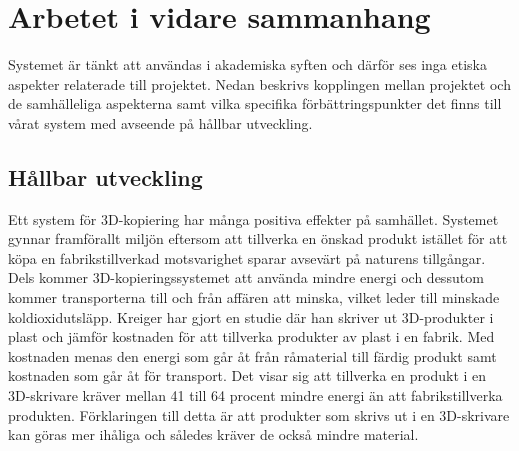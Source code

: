 
\section{Arbetet i vidare sammanhang}
\label{sec:work-wider-context}

Systemet är tänkt att användas i akademiska syften och därför ses inga etiska aspekter relaterade till projektet. Nedan beskrivs kopplingen mellan projektet och de samhälleliga aspekterna samt vilka specifika förbättringspunkter det finns till vårat system med avseende på hållbar utveckling.

\subsection{Hållbar utveckling}
\label{disc:hållbar_utveckling}
Ett system för 3D-kopiering har många positiva effekter på samhället. Systemet gynnar framförallt miljön eftersom att tillverka en önskad produkt istället för att köpa en fabrikstillverkad motsvarighet sparar avsevärt på naturens tillgångar. Dels kommer 3D-kopieringssystemet att använda mindre energi och dessutom kommer transporterna till och från affären att minska, vilket leder till minskade koldioxidutsläpp. Kreiger \cite{kreiger2013environmental} har gjort en studie där han skriver ut 3D-produkter i plast och jämför kostnaden för att tillverka produkter av plast i en fabrik. Med kostnaden menas den energi som går åt från råmaterial till färdig produkt samt kostnaden som går åt för transport. Det visar sig att tillverka en produkt i en 3D-skrivare kräver mellan 41 till 64 procent mindre energi än att fabrikstillverka produkten. Förklaringen till detta är att produkter som skrivs ut i en 3D-skrivare kan göras mer ihåliga och således kräver de också mindre material. 

